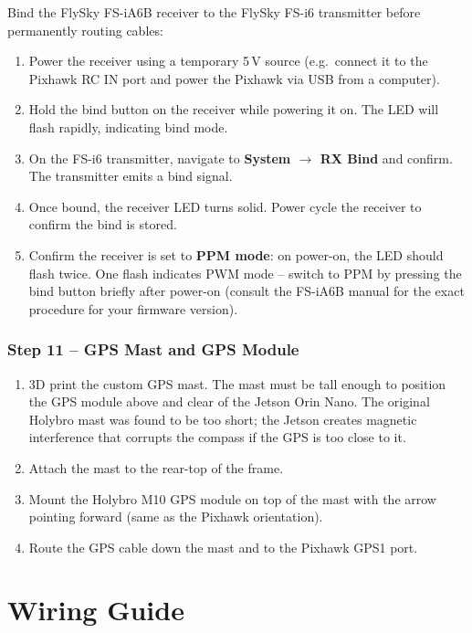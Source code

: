 \documentclass{article}
\begin{document}
Bind the FlySky FS-iA6B receiver to the FlySky FS-i6 transmitter before permanently routing cables:
\begin{enumerate}
    \item Power the receiver using a temporary 5\,V source (e.g.\ connect it to the Pixhawk RC IN port and power the Pixhawk via USB from a computer).
    \item Hold the bind button on the receiver while powering it on. The LED will flash rapidly, indicating bind mode.
    \item On the FS-i6 transmitter, navigate to \textbf{System $\rightarrow$ RX Bind} and confirm. The transmitter emits a bind signal.
    \item Once bound, the receiver LED turns solid. Power cycle the receiver to confirm the bind is stored.
    \item Confirm the receiver is set to \textbf{PPM mode}: on power-on, the LED should flash twice. One flash indicates PWM mode -- switch to PPM by pressing the bind button briefly after power-on (consult the FS-iA6B manual for the exact procedure for your firmware version).
\end{enumerate}

\subsubsection{Step 11 -- GPS Mast and GPS Module}

\begin{enumerate}
    \item 3D print the custom GPS mast. The mast must be tall enough to position the GPS module above and clear of the Jetson Orin Nano. The original Holybro mast was found to be too short; the Jetson creates magnetic interference that corrupts the compass if the GPS is too close to it.
    \item Attach the mast to the rear-top of the frame.
    \item Mount the Holybro M10 GPS module on top of the mast with the arrow pointing forward (same as the Pixhawk orientation).
    \item Route the GPS cable down the mast and to the Pixhawk GPS1 port.
\end{enumerate}

\section{Wiring Guide}
\label{sec:wiring}
\end{document}
